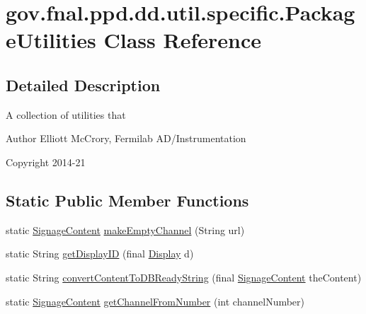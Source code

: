 \hypertarget{classgov_1_1fnal_1_1ppd_1_1dd_1_1util_1_1specific_1_1PackageUtilities}{\section{gov.\-fnal.\-ppd.\-dd.\-util.\-specific.\-Package\-Utilities Class Reference}
\label{classgov_1_1fnal_1_1ppd_1_1dd_1_1util_1_1specific_1_1PackageUtilities}
}


\subsection{Detailed Description}
A collection of utilities that

\begin{DoxyAuthor}{Author}
Elliott Mc\-Crory, Fermilab A\-D/\-Instrumentation 
\end{DoxyAuthor}
\begin{DoxyCopyright}{Copyright}
2014-\/21 
\end{DoxyCopyright}
\subsection*{Static Public Member Functions}
\begin{DoxyCompactItemize}
\item 
static \hyperlink{interfacegov_1_1fnal_1_1ppd_1_1dd_1_1signage_1_1SignageContent}{Signage\-Content} \hyperlink{classgov_1_1fnal_1_1ppd_1_1dd_1_1util_1_1specific_1_1PackageUtilities_a21b0b417b695336725658a6fde76b042}{make\-Empty\-Channel} (String url)
\item 
static String \hyperlink{classgov_1_1fnal_1_1ppd_1_1dd_1_1util_1_1specific_1_1PackageUtilities_ac76f976bf20f252c63f3fe1a5e934d55}{get\-Display\-I\-D} (final \hyperlink{interfacegov_1_1fnal_1_1ppd_1_1dd_1_1signage_1_1Display}{Display} d)
\item 
static String \hyperlink{classgov_1_1fnal_1_1ppd_1_1dd_1_1util_1_1specific_1_1PackageUtilities_a77b0bd55fcfdef42895b14ee8fd86e1b}{convert\-Content\-To\-D\-B\-Ready\-String} (final \hyperlink{interfacegov_1_1fnal_1_1ppd_1_1dd_1_1signage_1_1SignageContent}{Signage\-Content} the\-Content)
\item 
static \hyperlink{interfacegov_1_1fnal_1_1ppd_1_1dd_1_1signage_1_1SignageContent}{Signage\-Content} \hyperlink{classgov_1_1fnal_1_1ppd_1_1dd_1_1util_1_1specific_1_1PackageUtilities_aed411058ce30f98adc137f40cfa053f8}{get\-Channel\-From\-Number} (int channel\-Number)
\end{DoxyCompactItemize}


